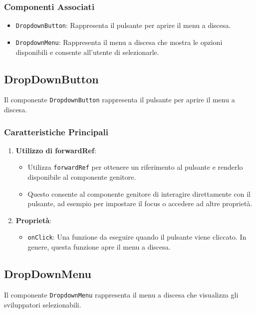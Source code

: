 \documentclass{article}
\begin{document}
\subsubsection*{Componenti Associati}

\begin{itemize}
    \item \texttt{DropdownButton}: Rappresenta il pulsante per aprire il menu a discesa.
    \item \texttt{DropdownMenu}: Rappresenta il menu a discesa che mostra le opzioni disponibili e consente all'utente di selezionarle.
\end{itemize}

\subsection*{DropDownButton}
Il componente \texttt{DropdownButton} rappresenta il pulsante per aprire il menu a discesa.

\subsubsection*{Caratteristiche Principali}

\begin{enumerate}
    \item \textbf{Utilizzo di forwardRef}:
    \begin{itemize}
        \item Utilizza \texttt{forwardRef} per ottenere un riferimento al pulsante e renderlo disponibile al componente genitore.
        \item Questo consente al componente genitore di interagire direttamente con il pulsante, ad esempio per impostare il focus o accedere ad altre proprietà.
    \end{itemize}
    
    \item \textbf{Proprietà}:
    \begin{itemize}
        \item \texttt{onClick}: Una funzione da eseguire quando il pulsante viene cliccato. In genere, questa funzione apre il menu a discesa.
    \end{itemize}
\end{enumerate}

\subsection*{DropDownMenu}
Il componente \texttt{DropdownMenu} rappresenta il menu a discesa che visualizza gli sviluppatori selezionabili.
\end{document}
